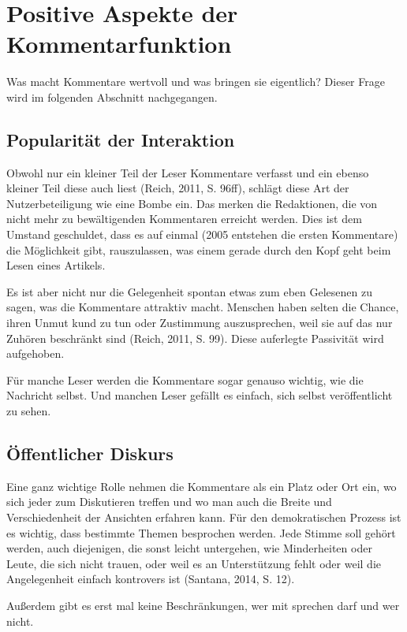 \section{Positive Aspekte der Kommentarfunktion}

Was macht Kommentare wertvoll und was bringen sie eigentlich? Dieser Frage wird
im folgenden Abschnitt nachgegangen.


\subsection{Popularität der Interaktion}

Obwohl nur ein kleiner Teil der Leser Kommentare verfasst und ein ebenso kleiner
Teil diese auch liest (Reich, 2011, S. 96ff), schlägt diese Art der
Nutzerbeteiligung wie eine Bombe ein. Das merken die Redaktionen, die von nicht
mehr zu bewältigenden Kommentaren erreicht werden. Dies ist dem Umstand
geschuldet, dass es auf einmal (2005 entstehen die ersten Kommentare) die
Möglichkeit gibt, rauszulassen, was einem gerade durch den Kopf geht beim Lesen
eines Artikels.

Es ist aber nicht nur die Gelegenheit spontan etwas zum eben Gelesenen zu sagen,
was die Kommentare attraktiv macht. Menschen haben selten die Chance, ihren
Unmut kund zu tun oder Zustimmung auszusprechen, weil sie auf das nur Zuhören
beschränkt sind (Reich, 2011, S. 99). Diese auferlegte Passivität wird
aufgehoben.

Für manche Leser werden die Kommentare sogar genauso wichtig, wie die Nachricht
selbst. Und manchen Leser gefällt es einfach, sich selbst veröffentlicht zu
sehen.


\subsection{Öffentlicher Diskurs}

Eine ganz wichtige Rolle nehmen die Kommentare als ein Platz oder Ort ein, wo
sich jeder zum Diskutieren treffen und wo man auch die Breite und
Verschiedenheit der Ansichten erfahren kann. Für den demokratischen Prozess ist
es wichtig, dass bestimmte Themen besprochen werden. Jede Stimme soll gehört
werden, auch diejenigen, die sonst leicht untergehen, wie Minderheiten oder
Leute, die sich nicht trauen, oder weil es an Unterstützung fehlt oder weil die
Angelegenheit einfach kontrovers ist (Santana, 2014, S. 12).

Außerdem gibt es erst mal keine Beschränkungen, wer mit sprechen darf und wer
nicht.

